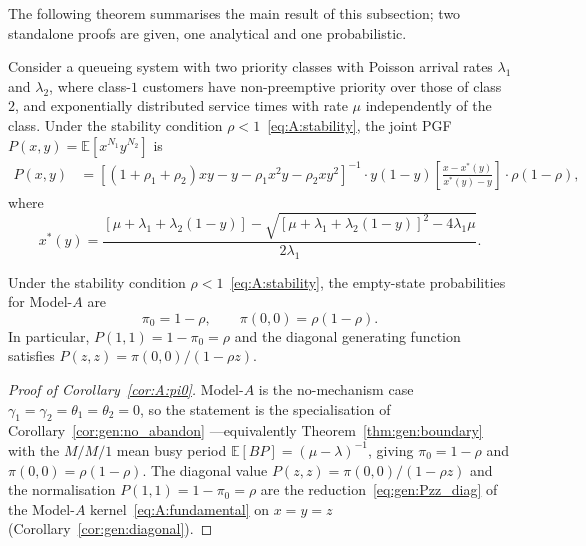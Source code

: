The following theorem summarises the main result of this subsection; two standalone
proofs are given, one analytical and one probabilistic.
\begin{theorem}\label{thm:A:PGF}
    Consider a queueing system with two priority classes with Poisson arrival rates
    $\lambda_1$ and $\lambda_2$, where class-$1$ customers have non-preemptive priority
    over those of class~$2$, and exponentially distributed service times with rate $\mu$
    independently of the class. Under the stability condition $\rho<1$~\eqref{eq:A:stability}, the
    joint PGF $P(x,y) = \mathbb{E}[x^{N_1}y^{N_2}]$ is
    \begin{align}
        P(x,y) &= \left[ (1+\rho_1 +\rho_2)xy - y -\rho_1x^2y - \rho_2xy^2 \right]^{-1}
                  \cdot y(1-y) \left[ \frac{x - x^*(y)}{x^*(y)-y} \right] \cdot \rho (1-\rho),
        \label{eq:A:PGF}
    \end{align}
    where
    \begin{equation}
        x^*(y) = \frac{\left[\mu + \lambda_1 + \lambda_2 (1-y)\right]
                       - \sqrt{\left[\mu + \lambda_1 + \lambda_2 (1-y)\right]^2 - 4 \lambda_1 \mu}}
                      {2 \lambda_1}.
        \label{eq:A:xstar_def}
    \end{equation}
\end{theorem}

\begin{corollary}\label{cor:A:pi0}
    Under the stability condition $\rho < 1$~\eqref{eq:A:stability}, the empty-state probabilities
    for Model-$A$ are
    \begin{equation}
        \pi_0 = 1-\rho, \qquad \pi(0,0) = \rho(1-\rho). \label{eq:A:pi0_pi00}
    \end{equation}
    In particular, $P(1,1) = 1-\pi_0 = \rho$ and the diagonal generating function
    satisfies $P(z,z)=\pi(0,0)/(1-\rho z)$.
\end{corollary}

\begin{proof}[Proof of Corollary~\ref{cor:A:pi0}]
    Model-$A$ is the no-mechanism case $\gamma_1=\gamma_2=\theta_1=\theta_2=0$, so the statement is the specialisation of Corollary~\ref{cor:gen:no_abandon} ---equivalently Theorem~\ref{thm:gen:boundary} with the $M/M/1$ mean busy period $\mathbb{E}[BP]=(\mu-\lambda)^{-1}$, giving $\pi_0=1-\rho$ and $\pi(0,0)=\rho(1-\rho)$. The diagonal value $P(z,z)=\pi(0,0)/(1-\rho z)$ and the normalisation $P(1,1)=1-\pi_0=\rho$ are the reduction~\eqref{eq:gen:Pzz_diag} of the Model-$A$ kernel~\eqref{eq:A:fundamental} on $x=y=z$ (Corollary~\ref{cor:gen:diagonal}).
\end{proof}

